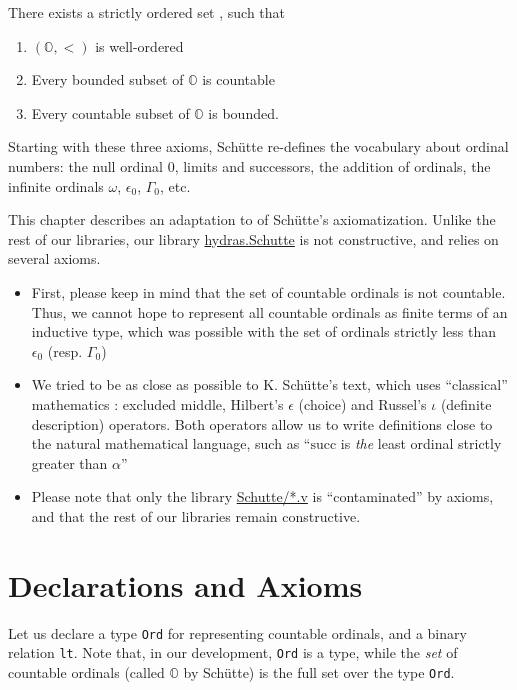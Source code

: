 There  exists a strictly ordered set , such that
\begin{enumerate}
\item  $(\mathbb{O},<)$ is well-ordered
\item Every bounded subset of $\mathbb{O}$  is countable
\item Every countable subset of $\mathbb{O}$  is bounded.
\end{enumerate}

Starting with these three axioms, Schütte re-defines the vocabulary about ordinal numbers: the null ordinal $0$, limits and successors, the addition of ordinals, the infinite ordinals $\omega$, $\epsilon_0$, $\Gamma_0$, etc.

This chapter describes an adaptation to \coq{} of Schütte's axiomatization. 
 Unlike the rest of our libraries, our library
\href{../theories/html/hydras.Schutte.Schutte.html}{hydras.Schutte}
is not constructive, and relies on several axioms.

\begin{itemize}
\item First, please keep in mind  that the set of countable ordinals is not countable. Thus, we cannot hope to represent all countable ordinals as finite terms of an inductive type, which was possible with  the set of ordinals strictly less than $\epsilon_0$ (resp. $\Gamma_0$)
\item We tried to be as close as possible to K. Schütte's text, which uses ``classical'' mathematics : excluded middle, Hilbert's $\epsilon$ (choice) and Russel's $\iota$ (definite description) operators. Both operators allow us to write definitions close to the natural mathematical language, such as ``$\textrm{succ}$ is \emph{the} least ordinal strictly greater than $\alpha$''
\item Please note that only the library \href{../theories/html/hydras.Schutte.Schutte.html}{Schutte/*.v} is ``contaminated'' by axioms, and that the rest of our libraries remain constructive.
\end{itemize}

\section{Declarations and Axioms}

Let us declare a type 
\texttt{Ord} for representing countable ordinals, and a binary relation
 \texttt{lt}. Note that, in our development, \texttt{Ord} is a type, while the \emph{set} of countable ordinals (called $\mathbb{O}$ by Schütte) 
is the full set over the type \texttt{Ord}.

